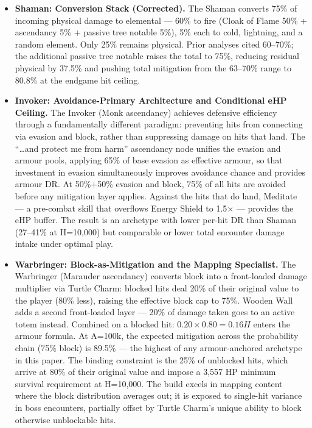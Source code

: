 \documentclass[12pt, letterpaper]{article}
\begin{document}
\begin{itemize}
    \item \textbf{Shaman: Conversion Stack (Corrected).} The Shaman converts 75\% of incoming physical damage to elemental --- 60\% to fire (Cloak of Flame 50\% + ascendancy 5\% + passive tree notable 5\%), 5\% each to cold, lightning, and a random element. Only 25\% remains physical. Prior analyses cited 60--70\%; the additional passive tree notable raises the total to 75\%, reducing residual physical by 37.5\% and pushing total mitigation from the 63--70\% range to 80.8\% at the endgame hit ceiling.

    \item \textbf{Invoker: Avoidance-Primary Architecture and Conditional eHP Ceiling.} The Invoker (Monk ascendancy) achieves defensive efficiency through a fundamentally different paradigm: preventing hits from connecting via evasion and block, rather than suppressing damage on hits that land. The ``\ldots and protect me from harm'' ascendancy node unifies the evasion and armour pools, applying 65\% of base evasion as effective armour, so that investment in evasion simultaneously improves avoidance chance and provides armour DR. At 50\%+50\% evasion and block, 75\% of all hits are avoided before any mitigation layer applies. Against the hits that do land, Meditate --- a pre-combat skill that overflows Energy Shield to 1.5$\times$ --- provides the eHP buffer. The result is an archetype with lower per-hit DR than Shaman (27--41\% at H=10{,}000) but comparable or lower total encounter damage intake under optimal play.

    \item \textbf{Warbringer: Block-as-Mitigation and the Mapping Specialist.} The Warbringer (Marauder ascendancy) converts block into a front-loaded damage multiplier via Turtle Charm: blocked hits deal 20\% of their original value to the player (80\% less), raising the effective block cap to 75\%. Wooden Wall adds a second front-loaded layer --- 20\% of damage taken goes to an active totem instead. Combined on a blocked hit: $0.20 \times 0.80 = 0.16H$ enters the armour formula. At A=100k, the expected mitigation across the probability chain (75\% block) is 89.5\% --- the highest of any armour-anchored archetype in this paper. The binding constraint is the 25\% of unblocked hits, which arrive at 80\% of their original value and impose a 3{,}557 HP minimum survival requirement at H=10{,}000. The build excels in mapping content where the block distribution averages out; it is exposed to single-hit variance in boss encounters, partially offset by Turtle Charm's unique ability to block otherwise unblockable hits.


\end{itemize}
\end{document}

